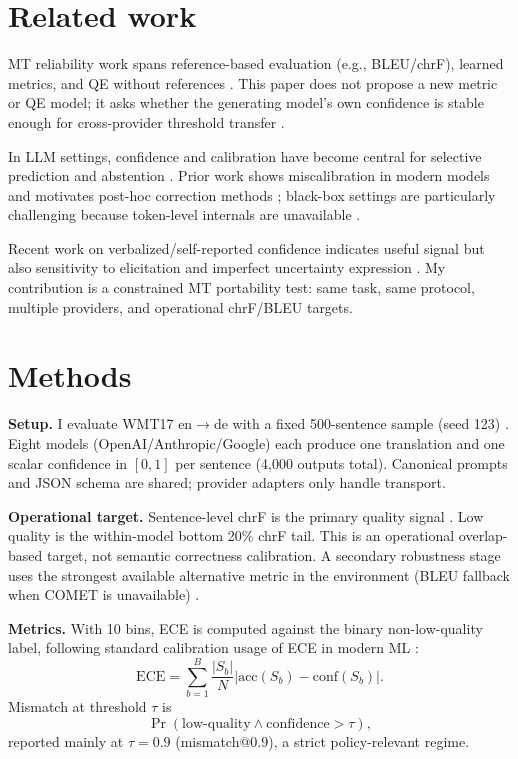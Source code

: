 \documentclass[10pt,conference]{IEEEtran}
\begin{document}
\section{Related work}
MT reliability work spans reference-based evaluation (e.g., BLEU/chrF), learned metrics, and QE without references \citep{papineni-etal-2002-bleu,popovic-2015-chrf,rei-etal-2020-comet,guerreiro-etal-2024-xcomet,rei-etal-2022-cometkiwi}. This paper does not propose a new metric or QE model; it asks whether the generating model's own confidence is stable enough for cross-provider threshold transfer \citep{blatz-etal-2004-confidence}.

In LLM settings, confidence and calibration have become central for selective prediction and abstention \citep{el-yaniv-wiener-2010-foundations}. Prior work shows miscalibration in modern models and motivates post-hoc correction methods \citep{guo-etal-2017-calibration,jiang-etal-2021-calibration-lm,tian-etal-2023-just-ask}; black-box settings are particularly challenging because token-level internals are unavailable \citep{ulmer-etal-2024-calibrating}.

Recent work on verbalized/self-reported confidence indicates useful signal but also sensitivity to elicitation and imperfect uncertainty expression \citep{yona-etal-2024-large}. My contribution is a constrained MT portability test: same task, same protocol, multiple providers, and operational chrF/BLEU targets.

\section{Methods}
\textbf{Setup.} I evaluate WMT17 en$\rightarrow$de with a fixed 500-sentence sample (seed 123) \citep{bojar-etal-2017-findings}. Eight models (OpenAI/Anthropic/Google) each produce one translation and one scalar confidence in $[0,1]$ per sentence (4,000 outputs total). Canonical prompts and JSON schema are shared; provider adapters only handle transport.

\textbf{Operational target.} Sentence-level chrF is the primary quality signal \citep{popovic-2015-chrf}. Low quality is the within-model bottom 20\% chrF tail. This is an operational overlap-based target, not semantic correctness calibration. A secondary robustness stage uses the strongest available alternative metric in the environment (BLEU fallback when COMET is unavailable) \citep{papineni-etal-2002-bleu,rei-etal-2020-comet}.

\textbf{Metrics.} With 10 bins, ECE is computed against the binary non-low-quality label, following standard calibration usage of ECE in modern ML \citep{guo-etal-2017-calibration}:
\[
\mathrm{ECE}=\sum_{b=1}^{B}\frac{|S_b|}{N}\left|\mathrm{acc}(S_b)-\mathrm{conf}(S_b)\right|.
\]
Mismatch at threshold $\tau$ is
\[
\Pr(\mathrm{low\mbox{-}quality}\wedge \mathrm{confidence}>\tau),
\]
reported mainly at $\tau=0.9$ (mismatch@0.9), a strict policy-relevant regime.
\end{document}
